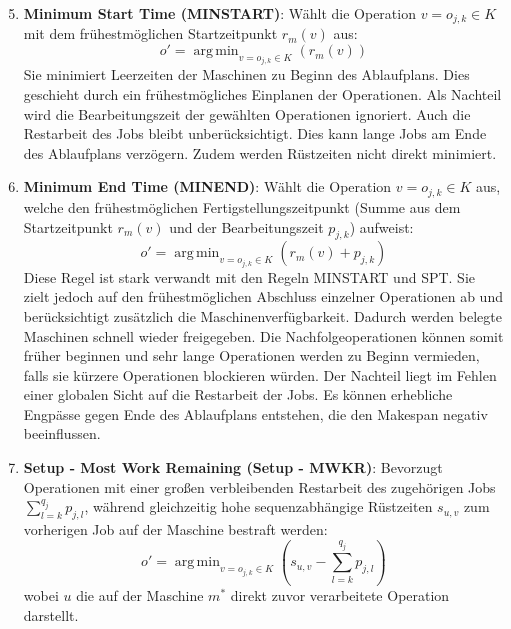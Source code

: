 \begin{enumerate}
    \setcounter{enumi}{4}
    \item \textbf{Minimum Start Time (MINSTART)}: Wählt die Operation $v = o_{j,k} \in K$ mit dem frühestmöglichen Startzeitpunkt $r_m(v)$ aus:
          \begin{equation}
              o' = \operatorname{arg\,min}_{v = o_{j,k} \in K} \left( r_m(v) \right)
          \end{equation}
          Sie minimiert Leerzeiten der Maschinen zu Beginn des Ablaufplans.
          Dies geschieht durch ein frühestmögliches Einplanen der Operationen.
          Als Nachteil wird die Bearbeitungszeit der gewählten Operationen ignoriert.
          Auch die Restarbeit des Jobs bleibt unberücksichtigt.
          Dies kann lange Jobs am Ende des Ablaufplans verzögern.
          Zudem werden Rüstzeiten nicht direkt minimiert.

    \item \textbf{Minimum End Time (MINEND)}: Wählt die Operation $v = o_{j,k} \in K$ aus, welche den frühestmöglichen Fertigstellungszeitpunkt (Summe aus dem Startzeitpunkt $r_m(v)$ und der Bearbeitungszeit $p_{j,k}$) aufweist:
          \begin{equation}
              o' = \operatorname{arg\,min}_{v = o_{j,k} \in K} \left( r_m(v) + p_{j,k} \right)
          \end{equation}
          Diese Regel ist stark verwandt mit den Regeln MINSTART und SPT. Sie zielt jedoch auf den frühestmöglichen Abschluss einzelner Operationen ab und berücksichtigt zusätzlich die Maschinenverfügbarkeit.
          Dadurch werden belegte Maschinen schnell wieder freigegeben.
          Die Nachfolgeoperationen können somit früher beginnen und sehr lange Operationen werden zu Beginn vermieden, falls sie kürzere Operationen blockieren würden.
          Der Nachteil liegt im Fehlen einer globalen Sicht auf die Restarbeit der Jobs.
          Es können erhebliche Engpässe gegen Ende des Ablaufplans entstehen, die den Makespan negativ beeinflussen.

    \item \textbf{Setup - Most Work Remaining (Setup - MWKR)}: Bevorzugt Operationen mit einer großen verbleibenden Restarbeit des zugehörigen Jobs $\sum_{l=k}^{q_j} p_{j,l}$, während gleichzeitig hohe sequenzabhängige Rüstzeiten $s_{u,v}$ zum vorherigen Job auf der Maschine bestraft werden:
          \begin{equation}
              o' = \operatorname{arg\,min}_{v = o_{j,k} \in K} \left( s_{u,v} - \sum_{l=k}^{q_j} p_{j,l} \right)
          \end{equation}
          wobei $u$ die auf der Maschine $m^*$ direkt zuvor verarbeitete Operation darstellt.


\end{enumerate}
